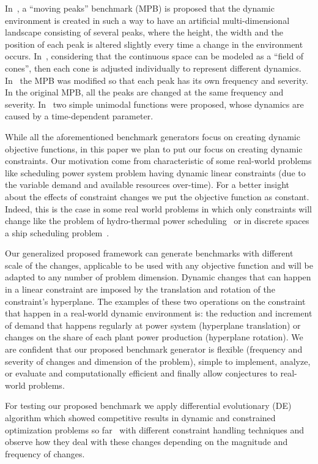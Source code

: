 \documentclass[review]{elsarticle}
\begin{document}
In~\citep{branke1999memory}, a “moving peaks” benchmark (MPB) is proposed that the dynamic environment is created in such a way to have an artificial multi-dimensional landscape consisting of several peaks, where the height, the width and the position of each peak is altered slightly every time a change in the environment occurs. 
In~\citep{morrison1999test}, considering that the continuous space can be modeled as a “field of cones”, then each cone is adjusted individually to represent different dynamics.
In~\citep{yu2010robust} the MPB was modified so that each peak has its own frequency and severity. In the original MPB, all the peaks are changed at the same frequency and severity. 
In~\cite{liu2008new} two simple unimodal functions were proposed, whose dynamics are caused by a time-dependent parameter.

While all the aforementioned benchmark generators focus on creating dynamic objective functions, in this paper we plan to put our focus on creating dynamic constraints. Our motivation come from characteristic of some real-world problems like scheduling power system problem having dynamic linear constraints (due to the variable demand and available resources over-time). For a better insight about the effects of constraint changes we put the objective function as constant. Indeed, this is the case in some real world problems in which only constraints will change like the problem of hydro-thermal power scheduling~\citep{deb2007dynamic} or in discrete spaces a ship scheduling problem~\citep{mertens2006dyncoaa}.

Our generalized proposed framework can generate benchmarks with different scale of the changes, applicable to be used with any objective function and will be adapted to any number of problem dimension. 
Dynamic changes that can happen in a linear constraint are imposed by the translation and rotation of the constraint's hyperplane.
The examples of these two operations on the constraint that happen in a real-world dynamic environment is: the reduction and increment of demand that happens regularly at power system (hyperplane translation) or changes on the share of each plant power production (hyperplane rotation).
We are confident that our proposed benchmark generator is flexible (frequency and severity of changes and dimension of the problem), simple to implement, analyze, or evaluate and computationally efficient and finally allow conjectures to real-world problems.
 
For testing our proposed benchmark we apply differential evolutionary (DE) algorithm which showed competitive results in dynamic and constrained optimization problems so far~\citep{ameca2018comparison} with different constraint handling techniques and observe how they deal with these changes depending on the magnitude and frequency of changes. 
\end{document}
